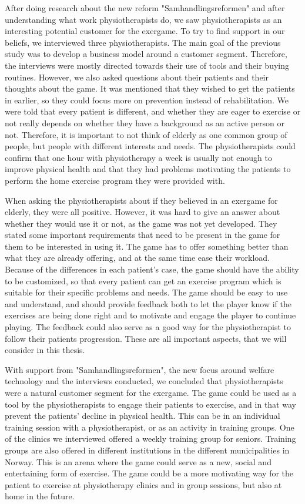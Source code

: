 After doing research about the new reform "Samhandlingsreformen" and after understanding what work physiotherapists do, we saw physiotherapists as an interesting potential customer for the exergame. To try to find support in our beliefs, we interviewed three physiotherapists. The main goal of the previous study was to develop a business model around a customer segment. Therefore, the interviews were mostly directed towards their use of tools and their buying routines. However, we also asked questions about their patients and their thoughts about the game. It was mentioned that they wished to get the patients in earlier, so they could focus more on prevention instead of rehabilitation. We were told that every patient is different, and whether they are eager to exercise or not really depends on whether they have a background as an active person or not. Therefore, it is important to not think of elderly as one common group of people, but people with different interests and needs. The physiotherapists could confirm that one hour with physiotherapy a week is usually not enough to improve physical health and that they had problems motivating the patients to perform the home exercise program they were provided with. 

When asking the physiotherapists about if they believed in an exergame for elderly, they were all positive. However, it was hard to give an answer about whether they would use it or not, as the game was not yet developed. They stated some important requirements that need to be present in the game for them to be interested in using it. The game has to offer something better than what they are already offering, and at the same time ease their workload. Because of the differences in each patient's case, the game should have the ability to be customized, so that every patient can get an exercise program which is suitable for their specific problems and needs. The game should be easy to use and understand, and should provide feedback both to let the player know if the exercises are being done right and to motivate and engage the player to continue playing. The feedback could also serve as a good way for the physiotherapist to follow their patients progression. These are all important aspects, that we will consider in this thesis.

With support from "Samhandlingsreformen", the new focus around welfare technology and the interviews conducted, we concluded that physiotherapists were a natural customer segment for the exergame. The game could be used as a tool by the physiotherapists to engage their patients to exercise, and in that way prevent the patients' decline in physical health. This can be in an individual training session with a physiotherapist, or as an activity in training groups. One of the clinics we interviewed offered a weekly training group for seniors. Training groups are also offered in different institutions in the different municipalities in Norway. This is an arena where the game could serve as a new, social and entertaining form of exercise. The game could be a more motivating way for the patient to exercise at physiotherapy clinics and in group sessions, but also at home in the future. 

